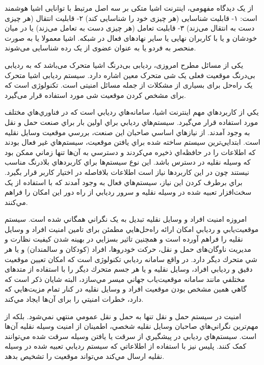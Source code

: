 از یک دیدگاه مفهومی، اینترنت اشیا متکی بر سه اصل مرتبط با توانایی اشیا هوشمند است:
 ۱- قابلیت شناسایی (هر چیزی خود را شناسایی کند) ۲- قابلیت انتقال (هر چیزی دست به انتقال می‌زند) ۳- قابلیت تعامل (هر چیزی دست به تعامل می‌زند) یا در میان خودشان و یا با کاربران نهایی یا سایر نهادهای فعال در شبکه. اشیا معمولا یا به صورت منحصر به فردو یا به عنوان عضوی از یک رده شناسایی می‌شوند.


یکی از مسائل مطرح امروزی، ردیابی بی‌درنگ اشیا متحرک می‌باشد که به ردیابی بی‌درنگ موقعیت فعلی یک شی متحرک معین اشاره دارد. 
سیستم ردیابی اشیا متحرک یک راه‌حل برای بسیاری از مشکلات از جمله مسائل امنیتی است. تکنولوژی است که برای مشخص کردن موقعیت شی مورد استفاده قرار می‌گیرد.


يكي از كاربردهاي مهم اينترنت اشيا، سامانه‌هاي رديابي است كه در فناوري‌هاي مختلف مورد استفاده قرار مي‌گیرد. سيستم‌هاي رديابي براي اولين بار براي صنعت حمل و نقل به وجود آمدند. از نيازهاي اساسي صاحبان اين صنعت، بررسي موقعيت وسايل نقليه است. ابتدايي‌ترين سيستم‌ ساخته شده براي يافتن موقعيت، سيستم‌هاي غير فعال بودند كه اطلاعات را در حافظه‌اي ذخیره مي‌كردند و دسترسي به آن‌ها تنها زماني ممكن بود كه وسيله نقليه در دسترس باشد. اين نوع سيستم‌ها براي كاربردهاي بلادرنگ مناسب نيستند چون در اين كاربردها نياز است اطلاعات بلافاصله در اختيار كاربر قرار بگيرد. براي برطرف كردن اين نياز، سيستم‌هاي فعال به وجود آمدند كه با استفاده از يک سخت‌افزار تعبيه شده در وسيله نقليه و سرور رديابي از راه دور اين امكان را فراهم مي‌كنند.


امروزه امنيت افراد و وسايل نقليه تبديل به يک نگراني همگاني شده است. سيستم موقعيت‌يابي و رديابي امکان ارائه راه‌حل‌هايي مطمئن برای تامين امنيت افراد و وسايل نقليه را فراهم آورده است و همچنين تاثير بسزايي در بهينه شدن كيفيت نظارت و مديريت ناوگان‌های حمل و نقل، حركت خودروها، افراد (کودکان و سالمندان) و يا هر شي متحرك ديگر دارد. در واقع سامانه رديابي تکنولوژی است كه امکان تعيين موقعيت دقيق و رديابي افراد، وسايل نقليه و يا هر جسم متحرك ديگر را با استفاده از متدهای مختلفي مانند سامانه موقعيت‌‌یاب جهاني  ميسر مي‌سازد، البته شايان ذكر است كه گاهي همين مشخص بودن موقعيت افراد و وسايل نقليه در كنار تمام مزيت‌هايي كه دارد، خطرات امنيتي را برای آن‌ها ايجاد مي‌كند. \cite{Rahman2016}


امنيت در سيستم حمل و نقل تنها به حمل و نقل عمومي منتهي نمي‌شود. بلكه از مهم‌ترین نگراني‌هاي صاحبان وسايل نقليه شخصي، اطمينان از امنيت وسيله نقليه آن‌ها است. سيستم‌هاي رديابي در پيشگيري از سرقت يا یافتن وسيله سرقت شده مي‌توانند كمک كنند. پلیس نيز با استفاده از
اطلاعاتي كه سيستم رديابي تعبیه شده در وسيله نقليه ارسال مي‌كند مي‌تواند موقعيت را تشخيص بدهد.



